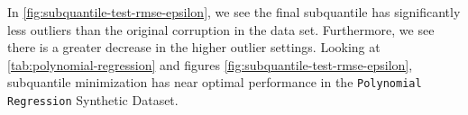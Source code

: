 \documentclass{article} %
\theoremstyle{plain}
\theoremstyle{definition}
\theoremstyle{remark}
\newcommand{\ccref}[1]{\textcolor{black}{\cref{#1}}}
\begin{document}
\begin{figure*}[!hbtp]
{}
	\caption{Test RMSE over the iterations in \texttt{Concrete}, \texttt{Boston Housing}, and \texttt{Polynomial} Datasets for \textsc{Subquantile} at different noise levels} 
	\label{fig:subquantile-test-rmse-epsilon}
\end{figure*}
In \ccref{fig:subquantile-test-rmse-epsilon}, we see the final subquantile has significantly less outliers than the original corruption in the data set. Furthermore, we see there is a greater decrease in the higher outlier settings. Looking at \ccref{tab:polynomial-regression} and figures \ccref{fig:subquantile-test-rmse-epsilon}, subquantile minimization has near optimal performance in the \texttt{Polynomial Regression} Synthetic Dataset.
\end{document}

